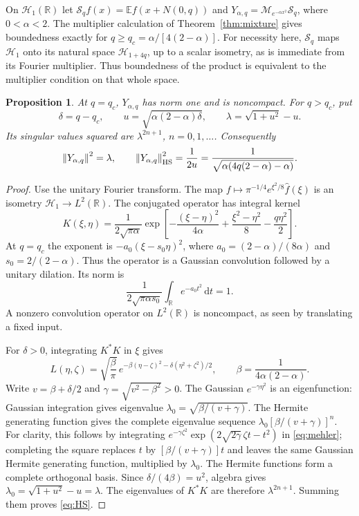 \documentclass[11pt,a4paper]{article}
\newtheorem{proposition}[theorem]{Proposition}
\theoremstyle{remark}
\newcommand{\R}{\mathbb R}
\newcommand{\E}{\mathbb E}
\newcommand{\HH}{\mathcal H}
\newcommand{\dd}{\,\mathrm d}
\newcommand{\norm}[1]{\left\lVert#1\right\rVert}
\newcommand{\Mult}{\mathcal M}
\begin{document}
On $\HH_1(\R)$ let $\mathcal S_qf(x)=\E f(x+N(0,q))$ and
$Y_{\alpha,q}=\Mult_{e^{-\alpha x^2}}\mathcal S_q$, where
$0<\alpha<2$. The multiplier calculation of Theorem~\ref{thm:mixture}
gives boundedness exactly for $q\ge q_c=\alpha/[4(2-\alpha)]$. For
necessity here, $\mathcal S_q$ maps $\HH_1$ onto its natural space
$\HH_{1+4q}$, up to a scalar isometry, as is immediate from its Fourier
multiplier. Thus boundedness of the product is equivalent to the
multiplier condition on that whole space.

\begin{proposition}\label{prop:spectrum}
At $q=q_c$, $Y_{\alpha,q}$ has norm one and is noncompact.
For $q>q_c$, put
\[
 \delta=q-q_c,\qquad
 u=\sqrt{\alpha(2-\alpha)\delta},\qquad
 \lambda=\sqrt{1+u^2}-u.
\]
Its singular values squared are $\lambda^{2n+1}$,
$n=0,1,\ldots$. Consequently
\begin{equation}\label{eq:HS}
 \norm{Y_{\alpha,q}}^2=\lambda,\qquad
 \norm{Y_{\alpha,q}}_{\rm HS}^2
   =\frac1{2u}
   =\frac1{\sqrt{\alpha(4q(2-\alpha)-\alpha)}}.
\end{equation}
\end{proposition}

\begin{proof}
Use the unitary Fourier transform. The map
$f\mapsto\pi^{-1/4}e^{\xi^2/8}\widehat f(\xi)$
is an isometry $\HH_1\to L^2(\R)$.
The conjugated operator has integral kernel
\begin{equation}\label{eq:gaussiankernel}
 K(\xi,\eta)=\frac1{2\sqrt{\pi\alpha}}
 \exp\!\left[-\frac{(\xi-\eta)^2}{4\alpha}
                  +\frac{\xi^2-\eta^2}{8}
                  -\frac{q\eta^2}{2}\right].
\end{equation}
At $q=q_c$ the exponent is $-a_0(\xi-s_0\eta)^2$,
where $a_0=(2-\alpha)/(8\alpha)$ and
$s_0=2/(2-\alpha)$. Thus the operator is a Gaussian
convolution followed by a unitary dilation. Its norm is
\[
 \frac1{2\sqrt{\pi\alpha s_0}}
        \int_{\R}e^{-a_0t^2}\dd t=1 .
 \]
A nonzero convolution operator on $L^2(\R)$ is noncompact,
as seen by translating a fixed input.

For $\delta>0$, integrating $K^*K$ in $\xi$ gives
\begin{equation}\label{eq:mehler}
 L(\eta,\zeta)=\sqrt{\frac{\beta}{\pi}}\,
 e^{-\beta(\eta-\zeta)^2-\delta(\eta^2+\zeta^2)/2},
 \qquad \beta=\frac1{4\alpha(2-\alpha)}.
\end{equation}
Write $v=\beta+\delta/2$ and
$\gamma=\sqrt{v^2-\beta^2}>0$.
The Gaussian $e^{-\gamma\eta^2}$ is an eigenfunction:
Gaussian integration gives eigenvalue
$\lambda_0=\sqrt{\beta/(v+\gamma)}$.
The Hermite generating function gives the complete eigenvalue
sequence
$\lambda_0[\beta/(v+\gamma)]^n$.
For clarity, this follows by integrating
$e^{-\gamma\zeta^2}
 \exp(2\sqrt{2\gamma}\,\zeta t-t^2)$ in
\eqref{eq:mehler}; completing the square replaces $t$
by $[\beta/(v+\gamma)]t$ and leaves the same Gaussian
Hermite generating function, multiplied by $\lambda_0$.
The Hermite functions form a complete orthogonal basis.
Since $\delta/(4\beta)=u^2$, algebra gives
$\lambda_0=\sqrt{1+u^2}-u=\lambda$.
The eigenvalues of $K^*K$ are therefore
$\lambda^{2n+1}$. Summing them proves \eqref{eq:HS}.
\end{proof}
\end{document}
